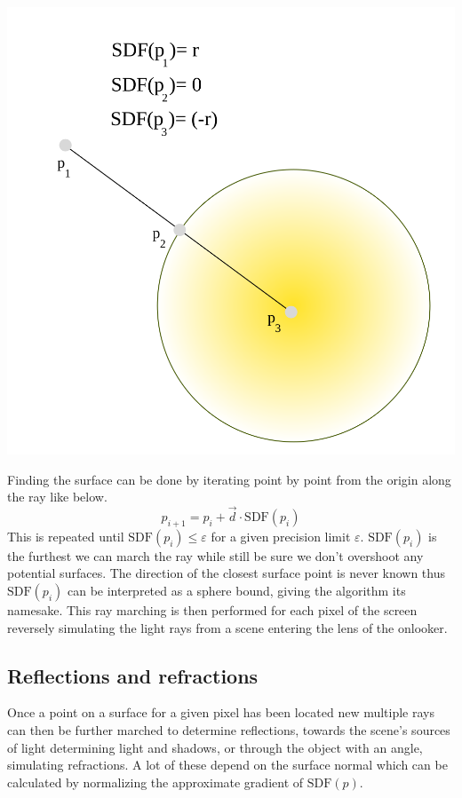 		\hfill
		\begin{minipage}{0.3\textwidth}
			\includegraphics[width=\linewidth]{figure/SDF} 
		\end{minipage}
		
		\bigskip
		
		Finding the surface can be done by iterating point by point from the
		origin along the ray like below. $$p_{i+1} = p_i + \vec{d}\cdot
		\text{SDF}(p_i)$$ This is repeated until $\text{SDF}(p_i) \leq
		\varepsilon$ for a given precision limit $\varepsilon$.
		$\text{SDF}(p_i)$ is the furthest we can march the ray while still be
		sure we don't overshoot any potential surfaces.  The direction of the
		closest surface point is never known thus $\text{SDF}(p_i)$ can be
		interpreted as a sphere bound, giving the algorithm its namesake. This
		ray marching is then performed for each pixel of the screen reversely
		simulating the light rays from a scene entering the lens of the
		onlooker.
			
			\subsection{Reflections and refractions}
		
				Once a point on a surface for a given pixel has been located
				new multiple rays can then be further marched to determine
				reflections, towards the scene's sources of light determining
				light and shadows, or through the object with an angle,
				simulating refractions. A lot of these depend on the surface
				normal which can be calculated by normalizing the approximate
				gradient of $\text{SDF}(p)$. 
		
